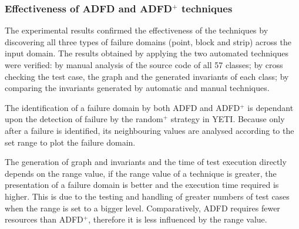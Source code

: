 






\subsubsection{Effectiveness of ADFD and ADFD$^+$ techniques}
The experimental results confirmed the effectiveness of the techniques by discovering all three types of failure domains (point, block and strip) across the input domain. The results obtained by applying the two automated techniques were verified: by manual analysis of the source code of all 57 classes; by cross checking the test case, the graph and the generated invariants of each class; by comparing the invariants generated by automatic and manual techniques. 

The identification of a failure domain by both ADFD and ADFD$^+$ is dependant upon the detection of failure by the random$^+$ strategy in YETI. Because only after a failure is identified, its neighbouring values are analysed according to the set range to plot the failure domain.

The generation of graph and invariants and the time of test execution directly depends on the range value, if the range value of a technique is greater, the presentation of a failure domain is better and the execution time required is higher. This is due to the testing and handling of greater numbers of test cases when the range is set to a bigger level. Comparatively, ADFD requires fewer resources than ADFD$^+$, therefore it is less influenced by the range value.

